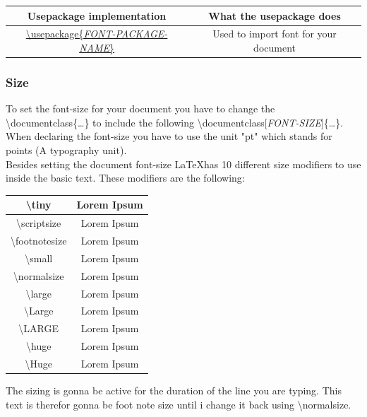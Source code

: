 \documentclass{article}
\newcommand{\jbs}[1]{\textbackslash{}#1} %
\begin{document}
\vspace{1.5em}
\begin{table}[H]
    \noindent
    \centering
    \begin{tabular}{|c|c|} \hline
        \rowcolor{gray!30}
        Usepackage implementation & What the usepackage does \\ \hline
        \hyperref[subsubsec:text_family]{\jbs{usepackage\{\textit{FONT-PACKAGE-NAME}\}}} & Used to import font for your document \\ \hline
    \end{tabular}
\end{table} %


\subsubsection{Size}\label{subsubsec:text_size}
To set the font-size for your document you have to change the \jbs{documentclass\{\ldots\}} to include the following \jbs{documentclass[\textit{FONT-SIZE}]\{\ldots\}}. When declaring the font-size you have to use the unit "pt" which stands for points (A typography unit).\\


Besides setting the document font-size \LaTeX has 10 different size modifiers to use inside the basic text. These modifiers are the following: \\

\begin{table}[H]
    \centering
    \begin{tabular}{|c|c|}
    \hline
        \jbs{tiny} & \tiny{Lorem Ipsum}  \\ \hline 
        \jbs{scriptsize} & \scriptsize{Lorem Ipsum} \\ \hline
        \jbs{footnotesize} & \footnotesize Lorem Ipsum \\ \hline
        \jbs{small} & \small Lorem Ipsum\\ \hline
        \jbs{normalsize} & \normalsize Lorem Ipsum\\ \hline
        \jbs{large} & \large Lorem Ipsum \\ \hline
        \jbs{Large} & \Large Lorem Ipsum \\ \hline
        \jbs{LARGE} & \LARGE Lorem Ipsum \\ \hline
        \jbs{huge} & \huge Lorem Ipsum \\ \hline
        \jbs{Huge} & \Huge Lorem Ipsum  \\ \hline
    \end{tabular}
    \label{tab:font_size}
\end{table}
The sizing is gonna be active for the duration of the line you are typing. \footnotesize This text is therefor gonna be foot note size until i change it back using \jbs{normalsize}. \normalsize
\end{document}
